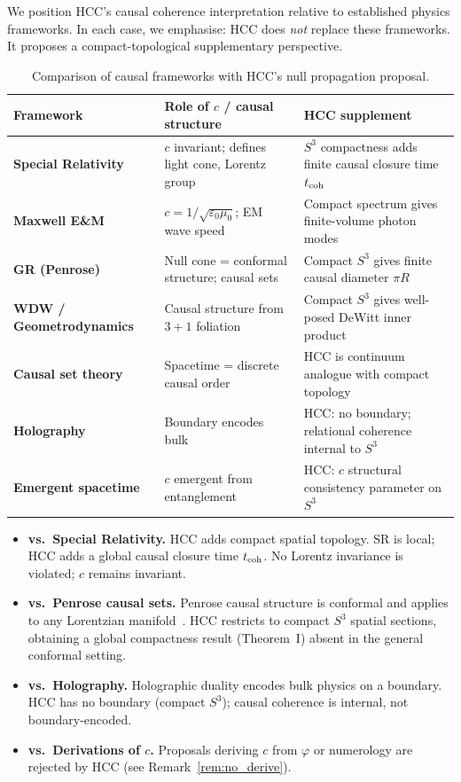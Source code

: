 \documentclass[12pt,a4paper]{article}
\theoremstyle{plain}
\theoremstyle{definition}
\theoremstyle{remark}
\newcommand{\vph}{\varphi}
\begin{document}
We position HCC's causal coherence interpretation relative to established
physics frameworks.
In each case, we emphasise: HCC does \emph{not} replace these frameworks.
It proposes a compact-topological supplementary perspective.

\renewcommand{\arraystretch}{1.35}
\begin{table}[h!]
\centering
\begin{tabularx}{\textwidth}{>{\bfseries\small}p{2.3cm}XX}
\toprule
\textbf{Framework} & \textbf{Role of $c$ / causal structure} & \textbf{HCC supplement}\\
\midrule
\rowcolor{rowA}
Special Relativity & $c$ invariant; defines light cone, Lorentz group & $S^3$ compactness adds finite causal closure time $t_{\rm coh}$\\
Maxwell E\&M & $c = 1/\sqrt{\varepsilon_0\mu_0}$; EM wave speed & Compact spectrum gives finite-volume photon modes\\
\rowcolor{rowA}
GR (Penrose) & Null cone = conformal structure; causal sets & Compact $S^3$ gives finite causal diameter $\pi R$\\
WDW / Geometrodynamics & Causal structure from $3+1$ foliation & Compact $S^3$ gives well-posed DeWitt inner product\\
\rowcolor{rowA}
Causal set theory & Spacetime = discrete causal order & HCC is continuum analogue with compact topology\\
Holography & Boundary encodes bulk & HCC: no boundary; relational coherence internal to $S^3$\\
\rowcolor{rowA}
Emergent spacetime & $c$ emergent from entanglement & HCC: $c$ structural consistency parameter on $S^3$\\
\bottomrule
\end{tabularx}
\caption{Comparison of causal frameworks with HCC's null propagation proposal.}
\label{tab:comparison}
\end{table}

\begin{tcolorbox}[limbox={Critical Differences from Established Frameworks}]
\begin{itemize}[leftmargin=1.4em]
  \item \textbf{vs.\ Special Relativity.} HCC adds compact spatial topology.
    SR is local; HCC adds a global causal closure time $t_{\rm coh}$.
    No Lorentz invariance is violated; $c$ remains invariant.
  \item \textbf{vs.\ Penrose causal sets.} Penrose causal structure is conformal
    and applies to any Lorentzian manifold~\cite{Pen72}.
    HCC restricts to compact $S^3$ spatial sections, obtaining a global
    compactness result (Theorem~I) absent in the general conformal setting.
  \item \textbf{vs.\ Holography.} Holographic duality encodes bulk physics
    on a boundary.
    HCC has no boundary (compact $S^3$); causal coherence is internal,
    not boundary-encoded.
  \item \textbf{vs.\ Derivations of $c$.}
    Proposals deriving $c$ from $\vph$ or numerology
    are rejected by HCC (see Remark~\ref{rem:no_derive}).
\end{itemize}
\end{tcolorbox}
\end{document}
